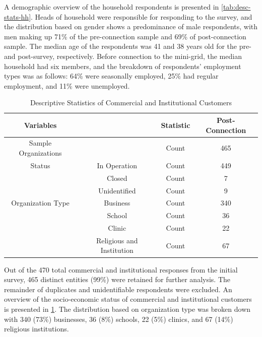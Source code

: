 A demographic overview of the household respondents is presented in \cref{tab:desc-stats-hh}. Heads of household were responsible for responding to the survey, and the distribution based on gender shows a predominance of male respondents, with men making up 71\% of the pre-connection sample and 69\% of post-connection sample. The median age of the respondents was 41 and 38 years old for the pre- and post-survey, respectively. Before connection to the mini-grid, the median household had six members, and the breakdown of respondents' employment types was as follows: 64\% were seasonally employed, 25\% had regular employment, and 11\% were unemployed.

\begin{table}[th]
\centering
\begin{tabular}{*4c} 
    \toprule
    Variables &  & Statistic &  Post-Connection\\
    \midrule                 
    Sample Organizations  & & Count & 465 \\
    Status & In Operation & Count & 449 \\
           & Closed & Count & 7 \\
           & Unidentified & Count & 9 \\
    Organization Type  & Business & Count & 340 \\
                       & School & Count & 36 \\
                       & Clinic & Count & 22 \\
                       & Religious and Institution & Count & 67 \\
    \bottomrule
    \end{tabular}
\caption{Descriptive Statistics of Commercial and Institutional Customers}
\label{tab:desc-stats-com}
\end{table}

Out of the 470 total commercial and institutional responses from the initial survey, 465 distinct entities (99\%) were retained for further analysis. The remainder of duplicates and unidentifiable respondents were excluded. An overview of the socio-economic status of commercial and institutional customers is presented in \cref{tab:desc-stats-com}. The distribution based on organization type was broken down with 340 (73\%) businesses, 36 (8\%) schools, 22 (5\%) clinics, and 67 (14\%) religious institutions.

